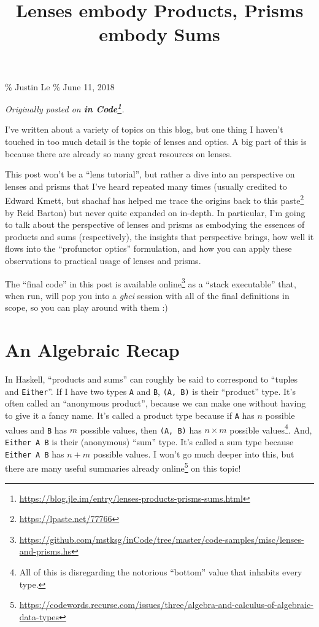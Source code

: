 \documentclass[]{article}
\title{Lenses embody Products, Prisms embody Sums}
\renewcommand{\href}[2]{#2\footnote{\url{#1}}}
\begin{document}
\maketitle

\% Justin Le \% June 11, 2018

\emph{Originally posted on
\textbf{\href{https://blog.jle.im/entry/lenses-products-prisms-sums.html}{in
Code}}.}

I've written about a variety of topics on this blog, but one thing I haven't
touched in too much detail is the topic of lenses and optics. A big part of this
is because there are already so many great resources on lenses.

This post won't be a ``lens tutorial'', but rather a dive into an perspective on
lenses and prisms that I've heard repeated many times (usually credited to
Edward Kmett, but shachaf has helped me trace the origins back to
\href{https://lpaste.net/77766}{this paste} by Reid Barton) but never quite
expanded on in-depth. In particular, I'm going to talk about the perspective of
lenses and prisms as embodying the essences of products and sums (respectively),
the insights that perspective brings, how well it flows into the ``profunctor
optics'' formulation, and how you can apply these observations to practical
usage of lenses and prisms.

The ``final code'' in this post is
\href{https://github.com/mstksg/inCode/tree/master/code-samples/misc/lenses-and-prisms.hs}{available
online} as a ``stack executable'' that, when run, will pop you into a
\emph{ghci} session with all of the final definitions in scope, so you can play
around with them :)

\section{An Algebraic Recap}\label{an-algebraic-recap}

In Haskell, ``products and sums'' can roughly be said to correspond to ``tuples
and \texttt{Either}''. If I have two types \texttt{A} and \texttt{B},
\texttt{(A,\ B)} is their ``product'' type. It's often called an ``anonymous
product'', because we can make one without having to give it a fancy name. It's
called a product type because if \texttt{A} has \(n\) possible values and
\texttt{B} has \(m\) possible values, then \texttt{(A,\ B)} has \(n \times m\)
possible values\footnote{All of this is disregarding the notorious ``bottom''
  value that inhabits every type.}. And, \texttt{Either\ A\ B} is their
(anonymous) ``sum'' type. It's called a sum type because \texttt{Either\ A\ B}
has \(n + m\) possible values. I won't go much deeper into this, but there are
\href{https://codewords.recurse.com/issues/three/algebra-and-calculus-of-algebraic-data-types}{many
useful summaries already online} on this topic!
\end{document}
